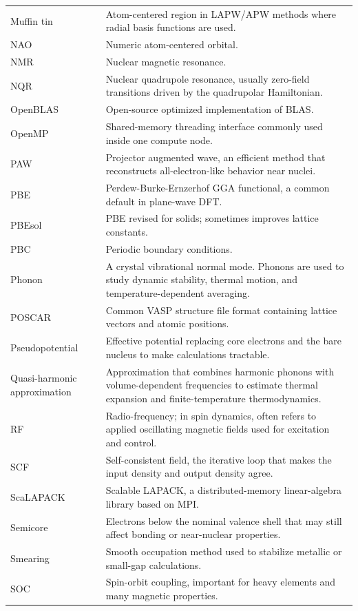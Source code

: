 \documentclass[11pt]{article}
\begin{document}
\begin{longtable}{@{}L{0.18\textwidth}L{0.76\textwidth}@{}}
Muffin tin & Atom-centered region in LAPW/APW methods where radial basis functions are used. \\
NAO & Numeric atom-centered orbital. \\
NMR & Nuclear magnetic resonance. \\
NQR & Nuclear quadrupole resonance, usually zero-field transitions driven by the quadrupolar Hamiltonian. \\
OpenBLAS & Open-source optimized implementation of BLAS. \\
OpenMP & Shared-memory threading interface commonly used inside one compute node. \\
PAW & Projector augmented wave, an efficient method that reconstructs all-electron-like behavior near nuclei. \\
PBE & Perdew-Burke-Ernzerhof GGA functional, a common default in plane-wave DFT. \\
PBEsol & PBE revised for solids; sometimes improves lattice constants. \\
PBC & Periodic boundary conditions. \\
Phonon & A crystal vibrational normal mode.  Phonons are used to study dynamic stability, thermal motion, and temperature-dependent averaging. \\
POSCAR & Common VASP structure file format containing lattice vectors and atomic positions. \\
Pseudopotential & Effective potential replacing core electrons and the bare nucleus to make calculations tractable. \\
Quasi-harmonic approximation & Approximation that combines harmonic phonons with volume-dependent frequencies to estimate thermal expansion and finite-temperature thermodynamics. \\
RF & Radio-frequency; in spin dynamics, often refers to applied oscillating magnetic fields used for excitation and control. \\
SCF & Self-consistent field, the iterative loop that makes the input density and output density agree. \\
ScaLAPACK & Scalable LAPACK, a distributed-memory linear-algebra library based on MPI. \\
Semicore & Electrons below the nominal valence shell that may still affect bonding or near-nuclear properties. \\
Smearing & Smooth occupation method used to stabilize metallic or small-gap calculations. \\
SOC & Spin-orbit coupling, important for heavy elements and many magnetic properties. \\

\end{longtable}
\end{document}
